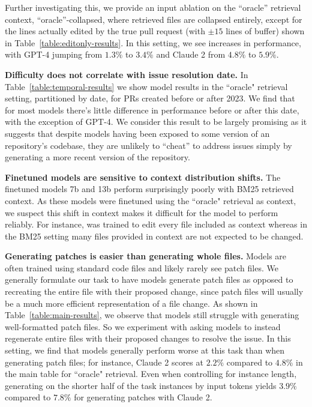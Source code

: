 
Further investigating this, we provide an input ablation on the ``oracle'' retrieval context, ``oracle''-collapsed, where retrieved files are collapsed entirely, except for the lines actually edited by the true pull request (with $\pm15$ lines of buffer) shown in Table~\ref{table:editonly-results}. In this setting, we see increases in performance, with GPT-4 jumping from $1.3\%$ to $3.4\%$ and Claude 2 from $4.8\%$ to $5.9\%$.

\textbf{Difficulty does not correlate with issue resolution date.}
In Table~\ref{table:temporal-results} we show model results in the ``oracle" retrieval setting, partitioned by date, for PRs created before or after 2023.
We find that for most models there's little difference in performance before or after this date, with the exception of GPT-4.
We consider this result to be largely promising as it suggests that despite models having been exposed to some version of an repository's codebase, they are unlikely to ``cheat'' to address issues simply by generating a more recent version of the repository.



\textbf{Finetuned models are sensitive to context distribution shifts.}
The finetuned models \swellama{} 7b and 13b perform surprisingly poorly with BM25 retrieved context.
As these models were finetuned using the ``oracle" retrieval as context, we suspect this shift in context makes it difficult for the model to perform reliably.
For instance, \swellama{} was trained to edit every file included as context whereas in the BM25 setting many files provided in context are not expected to be changed.

\textbf{Generating patches is easier than generating whole files.}
Models are often trained using standard code files and likely rarely see patch files. 
We generally formulate our task to have models generate patch files as opposed to recreating the entire file with their proposed change, since patch files will usually be a much more efficient representation of a file change.
As shown in Table~\ref{table:main-results}, we observe that models still struggle with generating well-formatted patch files.
So we experiment with asking models to instead regenerate entire files with their proposed changes to resolve the issue.
In this setting, we find that models generally perform worse at this task than when generating patch files; for instance, Claude 2 scores at $2.2\%$ compared to $4.8\%$ in the main table for ``oracle" retrieval.
Even when controlling for instance length, generating on the shorter half of the task instances by input tokens yields $3.9\%$ compared to $7.8\%$ for generating patches with Claude 2.

